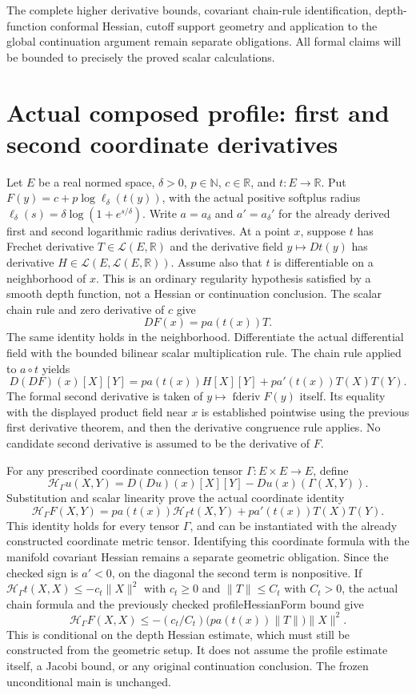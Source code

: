 \documentclass[11pt]{article}
\theoremstyle{definition}
\theoremstyle{remark}
\numberwithin{equation}{section}
\begin{document}
The complete higher derivative bounds, covariant chain-rule identification,
depth-function conformal Hessian, cutoff support geometry and application
to the global continuation argument remain separate obligations. All formal
claims will be bounded to precisely the proved scalar calculations.


\section{Actual composed profile: first and second coordinate derivatives}
\label{profile-chain:definitions}\label{profile-chain:first}\label{profile-chain:second}\label{profile-chain:hessian}
Let $E$ be a real normed space, $\delta>0$, $p\in\mathbb N$, $c\in\mathbb R$, and $t:E\to\mathbb R$.
Put $F(y)=c+p\log\ell_\delta(t(y))$, with the actual positive softplus radius $\ell_\delta(s)=\delta\log(1+e^{s/\delta})$.
Write $a=a_\delta$ and $a'=a_\delta'$ for the already derived first and second logarithmic radius derivatives.
At a point $x$, suppose $t$ has Frechet derivative $T\in\mathcal L(E,\mathbb R)$ and the derivative field $y\mapsto Dt(y)$ has derivative $H\in\mathcal L(E,\mathcal L(E,\mathbb R))$.
Assume also that $t$ is differentiable on a neighborhood of $x$. This is an ordinary regularity hypothesis satisfied by a smooth depth function, not a Hessian or continuation conclusion.
The scalar chain rule and zero derivative of $c$ give
\[
 DF(x)=p a(t(x))T.
\]
The same identity holds in the neighborhood. Differentiate the actual differential field with the bounded bilinear scalar multiplication rule. The chain rule applied to $a\circ t$ yields
\[
 D(DF)(x)[X][Y]
 =p a(t(x))H[X][Y]+p a'(t(x))T(X)T(Y).
\]
The formal second derivative is taken of $y\mapsto\operatorname{fderiv}F(y)$ itself. Its equality with the displayed product field near $x$ is established pointwise using the previous first derivative theorem, and then the derivative congruence rule applies. No candidate second derivative is assumed to be the derivative of $F$.

For any prescribed coordinate connection tensor $\Gamma:E\times E\to E$, define
\[
 \mathcal H_\Gamma u(X,Y)=D(Du)(x)[X][Y]-Du(x)(\Gamma(X,Y)).
\]
Substitution and scalar linearity prove the actual coordinate identity
\[
 \mathcal H_\Gamma F(X,Y)
 =p a(t(x))\mathcal H_\Gamma t(X,Y)
  +p a'(t(x))T(X)T(Y).
\]
This identity holds for every tensor $\Gamma$, and can be instantiated with the already constructed coordinate metric tensor. Identifying this coordinate formula with the manifold covariant Hessian remains a separate geometric obligation.
Since the checked sign is $a'<0$, on the diagonal the second term is nonpositive. If $\mathcal H_\Gamma t(X,X)\le-c_t\|X\|^2$ with $c_t\ge0$ and $\|T\|\le C_t$ with $C_t>0$, the actual chain formula and the previously checked profileHessianForm bound give
\[
 \mathcal H_\Gamma F(X,X)
 \le-(c_t/C_t)\big(p a(t(x))\|T\|\big)\|X\|^2.
\]
This is conditional on the depth Hessian estimate, which must still be constructed from the geometric setup. It does not assume the profile estimate itself, a Jacobi bound, or any original continuation conclusion. The frozen unconditional main is unchanged.
\end{document}
